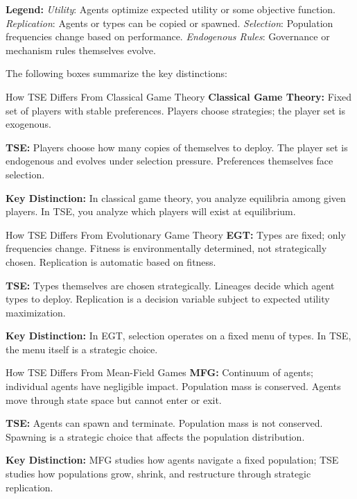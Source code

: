 \documentclass[12pt]{article}
\begin{document}
\noindent\textbf{Legend:} \textit{Utility}: Agents optimize expected utility or some objective function. \textit{Replication}: Agents or types can be copied or spawned. \textit{Selection}: Population frequencies change based on performance. \textit{Endogenous Rules}: Governance or mechanism rules themselves evolve.

\vspace{1em}
The following boxes summarize the key distinctions:

\begin{comparisonbox}{How TSE Differs From Classical Game Theory}
\textbf{Classical Game Theory:} Fixed set of players with stable preferences. Players choose strategies; the player set is exogenous.

\textbf{TSE:} Players choose how many copies of themselves to deploy. The player set is endogenous and evolves under selection pressure. Preferences themselves face selection.

\textbf{Key Distinction:} In classical game theory, you analyze equilibria among given players. In TSE, you analyze which players will exist at equilibrium.
\end{comparisonbox}

\begin{comparisonbox}{How TSE Differs From Evolutionary Game Theory}
\textbf{EGT:} Types are fixed; only frequencies change. Fitness is environmentally determined, not strategically chosen. Replication is automatic based on fitness.

\textbf{TSE:} Types themselves are chosen strategically. Lineages decide which agent types to deploy. Replication is a decision variable subject to expected utility maximization.

\textbf{Key Distinction:} In EGT, selection operates on a fixed menu of types. In TSE, the menu itself is a strategic choice.
\end{comparisonbox}

\begin{comparisonbox}{How TSE Differs From Mean-Field Games}
\textbf{MFG:} Continuum of agents; individual agents have negligible impact. Population mass is conserved. Agents move through state space but cannot enter or exit.

\textbf{TSE:} Agents can spawn and terminate. Population mass is not conserved. Spawning is a strategic choice that affects the population distribution.

\textbf{Key Distinction:} MFG studies how agents navigate a fixed population; TSE studies how populations grow, shrink, and restructure through strategic replication.
\end{comparisonbox}
\end{document}
